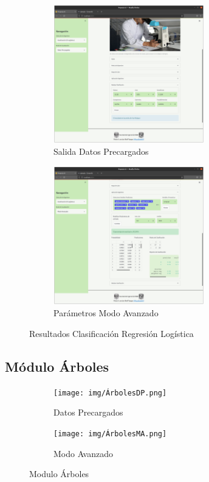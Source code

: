 \documentclass[10pt]{article}
\begin{document}
    \begin{figure}[H]
    
    \begin{subfigure}{0.5\textwidth}
    \centering
    \includegraphics[height=6cm]{img/RLogisticaDP_resultados.png} 
    \caption{Salida Datos Precargados}
    \label{fig:RLDPres}
    \end{subfigure}
    \begin{subfigure}{0.5\textwidth}
    \centering
    \includegraphics[height=6cm]{img/RLogisticaMA_resultados.png}
    \caption{Parámetros Modo Avanzado}
    \label{fig:RLMAres}
    \end{subfigure}
    
    \caption{Resultados Clasificación Regresión Logística}
    \label{fig:RLogisticRes}
    \end{figure}

\subsection{Módulo Árboles}

    \begin{figure}[H]
    
    \begin{subfigure}{0.5\textwidth}
    \centering
    \texttt{[image: img/ÁrbolesDP.png]} 
    \caption{Datos Precargados}
    \label{fig:ArbolDP}
    \end{subfigure}
    \begin{subfigure}{0.5\textwidth}
    \centering
    \texttt{[image: img/ÁrbolesMA.png]}
    \caption{Modo Avanzado}
    \label{fig:ArbolMA}
    \end{subfigure}
    
    \caption{Modulo Árboles}
    \label{fig:Arboles}
    \end{figure}
    
\end{document}
